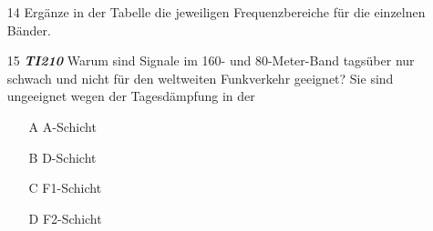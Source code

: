 \begin{enumerate} 
\itemsep1pt\parskip0pt
\item[14] Ergänze in der Tabelle die jeweiligen Frequenzbereiche für die einzelnen Bänder.
\end{enumerate}


\begin{figure}[H]
\end{figure}

\begin{enumerate} 
\itemsep1pt\parskip0pt
\item[15] \emph{\textbf{TI210}}   Warum sind Signale im 160- und 80-Meter-Band tagsüber nur schwach und nicht für den weltweiten Funkverkehr geeignet? Sie sind ungeeignet wegen der Tagesdämpfung in der
	\begin{enumerate}
	\itemsep1pt\parskip0pt
		\item[A] A-Schicht
		\item[B] D-Schicht
		\item[C] F1-Schicht
		\item[D] F2-Schicht
	\end{enumerate}
\end{enumerate}

